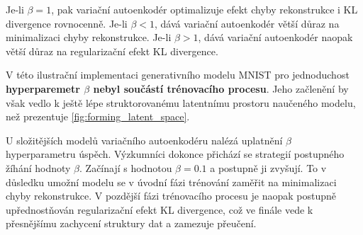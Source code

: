 Je-li $\beta = 1$, pak variační autoenkodér optimalizuje efekt chyby rekonstrukce i KL divergence rovnocenně.   
Je-li $\beta < 1$, dává variační autoenkodér větší důraz na minimalizaci chyby rekonstrukce.
Je-li $\beta > 1$, dává variační autoenkodér naopak větší důraz na regularizační efekt KL divergence.

V této ilustrační implementaci generativního modelu MNIST pro jednoduchost \textbf{hyperparemetr $\beta$ nebyl součástí trénovacího procesu}.
Jeho začlenění by však vedlo k ještě lépe struktorovanému latentnímu prostoru naučeného modelu, než prezentuje \autoref{fig:forming_latent_space}.

U složitějších modelů variačního autoenkodéru nalézá uplatnění $\beta$ hyperparametru úspěch.
Výzkumníci \textcite{Tomczak2017} dokonce přichází se strategií postupného žíhání hodnoty $\beta$.
Začínají s hodnotou $\beta = 0.1$ a postupně ji zvyšují.
To v důsledku umožní modelu se v úvodní fázi trénování zaměřit na minimalizaci chyby rekonstrukce.
V pozdější fázi trénovacího procesu je naopak postupně upřednostňován regularizační efekt KL divergence, což ve finále vede k přesnějšímu zachycení struktury dat a zamezuje přeučení.

